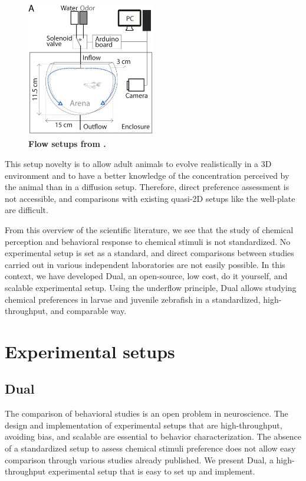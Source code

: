     \begin{figure}[h]
      \centering
      \includegraphics[width=0.5\textwidth]{part_2/assets/flow_1.png}
      \caption{\textbf{Flow setups from \cite{kermen2020stimulus}.}}
      \label{flow_1_setup}
    \end{figure}

    This setup novelty is to allow adult animals to evolve realistically in a 3D environment and to have a better knowledge of the concentration perceived by the animal than in a diffusion setup. Therefore, direct preference assessment is not accessible, and comparisons with existing quasi-2D setups like the well-plate are difficult.

    From this overview of the scientific literature, we see that the study of chemical perception and behavioral response to chemical stimuli is not standardized. No experimental setup is set as a standard, and direct comparisons between studies carried out in various independent laboratories are not easily possible. In this context, we have developed Dual, an open-source, low cost, do it yourself, and scalable experimental setup. Using the underflow principle, Dual allows studying chemical preferences in larvae and juvenile zebrafish in a standardized, high-throughput, and comparable way.

\chapter{Experimental setups}

  \section{Dual}
  The comparison of behavioral studies is an open problem in neuroscience. The design and implementation of experimental setups that are high-throughput, avoiding bias, and scalable are essential to behavior characterization. The absence of a standardized setup to assess chemical stimuli preference does not allow easy comparison through various studies already published. We present Dual, a high-throughput experimental setup that is easy to set up and implement.

